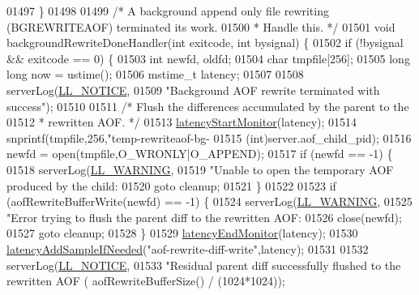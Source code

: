 \begin{DoxyCode}
{{{{{{{{{{{{{{{{{{{{{{{{{{{{{01497 \}
01498 
01499 \textcolor{comment}{/* A background append only file rewriting (BGREWRITEAOF) terminated its work.}
01500 \textcolor{comment}{ * Handle this. */}
01501 \textcolor{keywordtype}{void} backgroundRewriteDoneHandler(\textcolor{keywordtype}{int} exitcode, \textcolor{keywordtype}{int} bysignal) \{
01502     \textcolor{keywordflow}{if} (!bysignal && exitcode == 0) \{
01503         \textcolor{keywordtype}{int} newfd, oldfd;
01504         \textcolor{keywordtype}{char} tmpfile[256];
01505         \textcolor{keywordtype}{long} \textcolor{keywordtype}{long} now = ustime();
01506         mstime\_t latency;
01507 
01508         serverLog(\hyperlink{server_8h_a8c54c191e436c7dd3012167212692401}{LL\_NOTICE},
01509             \textcolor{stringliteral}{"Background AOF rewrite terminated with success"});
01510 
01511         \textcolor{comment}{/* Flush the differences accumulated by the parent to the}
01512 \textcolor{comment}{         * rewritten AOF. */}
01513         \hyperlink{latency_8h_a87d7b5b368dad97457f13466d760b0e1}{latencyStartMonitor}(latency);
01514         snprintf(tmpfile,256,\textcolor{stringliteral}{"temp-rewriteaof-bg-%
01515             (\textcolor{keywordtype}{int})server.aof\_child\_pid);
01516         newfd = open(tmpfile,O\_WRONLY|O\_APPEND);
01517         \textcolor{keywordflow}{if} (newfd == -1) \{
01518             serverLog(\hyperlink{server_8h_a31229b9334bba7d6be2a72970967a14b}{LL\_WARNING},
01519                 \textcolor{stringliteral}{"Unable to open the temporary AOF produced by the child: %
01520             \textcolor{keywordflow}{goto} cleanup;
01521         \}
01522 
01523         \textcolor{keywordflow}{if} (aofRewriteBufferWrite(newfd) == -1) \{
01524             serverLog(\hyperlink{server_8h_a31229b9334bba7d6be2a72970967a14b}{LL\_WARNING},
01525                 \textcolor{stringliteral}{"Error trying to flush the parent diff to the rewritten AOF: %
01526             close(newfd);
01527             \textcolor{keywordflow}{goto} cleanup;
01528         \}
01529         \hyperlink{latency_8h_a88461aee20da0a648fe3332b5f068df7}{latencyEndMonitor}(latency);
01530         \hyperlink{latency_8h_a77922ab34035890c90f98831a9071359}{latencyAddSampleIfNeeded}(\textcolor{stringliteral}{"aof-rewrite-diff-write"},latency);
01531 
01532         serverLog(\hyperlink{server_8h_a8c54c191e436c7dd3012167212692401}{LL\_NOTICE},
01533             \textcolor{stringliteral}{"Residual parent diff successfully flushed to the rewritten AOF (%
      aofRewriteBufferSize() / (1024*1024));
}}}}}}}}}}}}}}}}}}}}}}}}}}}}}}}}}
\end{DoxyCode}
